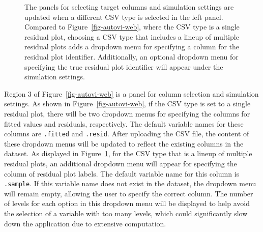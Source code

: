 \documentclass[
doublespace,
  times]{anzsauth}
\begin{document}
\begin{figure}


\caption{\label{fig-autovi-web-type}The panels for selecting target
columns and simulation settings are updated when a different CSV type is
selected in the left panel. Compared to Figure~\ref{fig-autovi-web},
where the CSV type is a single residual plot, choosing a CSV type that
includes a lineup of multiple residual plots adds a dropdown menu for
specifying a column for the residual plot identifier. Additionally, an
optional dropdown menu for specifying the true residual plot identifier
will appear under the simulation settings.}

\end{figure}%

Region 3 of Figure~\ref{fig-autovi-web} is a panel for column selection
and simulation settings. As shown in Figure~\ref{fig-autovi-web}, if the
CSV type is set to a single residual plot, there will be two dropdown
menus for specifying the columns for fitted values and residuals,
respectively. The default variable names for these columns are
\texttt{.fitted} and \texttt{.resid}. After uploading the CSV file, the
content of these dropdown menus will be updated to reflect the existing
columns in the dataset. As displayed in
Figure~\ref{fig-autovi-web-type}, for the CSV type that is a lineup of
multiple residual plots, an additional dropdown menu will appear for
specifying the column of residual plot labels. The default variable name
for this column is \texttt{.sample}. If this variable name does not
exist in the dataset, the dropdown menu will remain empty, allowing the
user to specify the correct column. The number of levels for each option
in this dropdown menu will be displayed to help avoid the selection of a
variable with too many levels, which could significantly slow down the
application due to extensive computation.
\end{document}
